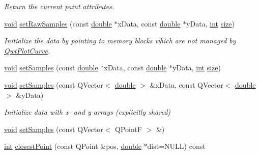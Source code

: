 \begin{DoxyCompactItemize}
\begin{DoxyCompactList}\small\item\em Return the current paint attributes. \end{DoxyCompactList}\item 
\hyperlink{group___u_a_v_objects_plugin_ga444cf2ff3f0ecbe028adce838d373f5c}{void} \hyperlink{class_qwt_plot_curve_afd13c94e23520dacbc37b4d0fd036a8b}{set\-Raw\-Samples} (const \hyperlink{_super_l_u_support_8h_a8956b2b9f49bf918deed98379d159ca7}{double} $\ast$x\-Data, const \hyperlink{_super_l_u_support_8h_a8956b2b9f49bf918deed98379d159ca7}{double} $\ast$y\-Data, \hyperlink{ioapi_8h_a787fa3cf048117ba7123753c1e74fcd6}{int} \hyperlink{glext_8h_a014d89bd76f74ef3a29c8f04b473eb76}{size})
\begin{DoxyCompactList}\small\item\em Initialize the data by pointing to memory blocks which are not managed by \hyperlink{class_qwt_plot_curve}{Qwt\-Plot\-Curve}. \end{DoxyCompactList}\item 
\hyperlink{group___u_a_v_objects_plugin_ga444cf2ff3f0ecbe028adce838d373f5c}{void} \hyperlink{class_qwt_plot_curve_aa51cd3fa00f2a046ca5a9889c5db2413}{set\-Samples} (const \hyperlink{_super_l_u_support_8h_a8956b2b9f49bf918deed98379d159ca7}{double} $\ast$x\-Data, const \hyperlink{_super_l_u_support_8h_a8956b2b9f49bf918deed98379d159ca7}{double} $\ast$y\-Data, \hyperlink{ioapi_8h_a787fa3cf048117ba7123753c1e74fcd6}{int} \hyperlink{glext_8h_a014d89bd76f74ef3a29c8f04b473eb76}{size})
\item 
\hyperlink{group___u_a_v_objects_plugin_ga444cf2ff3f0ecbe028adce838d373f5c}{void} \hyperlink{class_qwt_plot_curve_a1e6e9a417479e372197b746538fae47c}{set\-Samples} (const Q\-Vector$<$ \hyperlink{_super_l_u_support_8h_a8956b2b9f49bf918deed98379d159ca7}{double} $>$ \&x\-Data, const Q\-Vector$<$ \hyperlink{_super_l_u_support_8h_a8956b2b9f49bf918deed98379d159ca7}{double} $>$ \&y\-Data)
\begin{DoxyCompactList}\small\item\em Initialize data with x-\/ and y-\/arrays (explicitly shared) \end{DoxyCompactList}\item 
\hyperlink{group___u_a_v_objects_plugin_ga444cf2ff3f0ecbe028adce838d373f5c}{void} \hyperlink{class_qwt_plot_curve_a67b24f3663484ff5e973a288c6071b2a}{set\-Samples} (const Q\-Vector$<$ Q\-Point\-F $>$ \&)
\item 
\hyperlink{ioapi_8h_a787fa3cf048117ba7123753c1e74fcd6}{int} \hyperlink{class_qwt_plot_curve_a47620cb8ca3940f7007f8fb990d614f6}{closest\-Point} (const Q\-Point \&pos, \hyperlink{_super_l_u_support_8h_a8956b2b9f49bf918deed98379d159ca7}{double} $\ast$dist=N\-U\-L\-L) const 

\end{DoxyCompactItemize}
